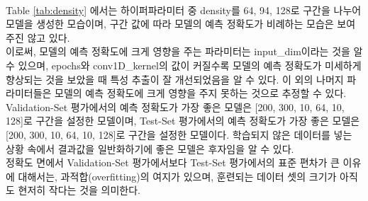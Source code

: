 \documentclass{jcse}
\begin{document}
\\Table \ref{tab:density} 에서는 하이퍼파라미터 중 density를 64, 94, 128로 구간을 나누어 모델을 생성한 모습이며, 구간 값에 따라 모델의 예측 정확도가 비례하는 모습은 보여주진 않고 있다.
\\이로써, 모델의 예측 정확도에 크게 영향을 주는 파라미터는 input\_dim이라는 것을 알 수 있으며, epochs와 conv1D\_kernel의 값이 커질수록 모델의 예측 정확도가 미세하게 향상되는 것을 보았을 때 특성 추출이 잘 개선되었음을 알 수 있다. 이 외의 나머지 파라미터들은 모델의 예측 정확도에 크게 영향을 주지 못하는 것으로 추정할 수 있다.
\\Validation-Set 평가에서의 예측 정확도가 가장 좋은 모델은 [200, 300, 10, 64, 10, 128]로 구간을 설정한 모델이며, Test-Set 평가에서의 예측 정확도가 가장 좋은 모델은 [200, 300, 10, 64, 10, 128]로 구간을 설정한 모델이다. 학습되지 않은 데이터를 넣는 상황 속에서 결과값을 일반화하기에 좋은 모델은 후자임을 알 수 있다.
\\정확도 면에서 Validation-Set 평가에서보다 Test-Set 평가에서의 표준 편차가 큰 이유에 대해서는, 과적합(overfitting)\cite{cite:overfitting}의 여지가 있으며, 훈련되는 데이터 셋의 크기가 아직도 현저히 작다는 것을 의미한다.
\\
\end{document}
